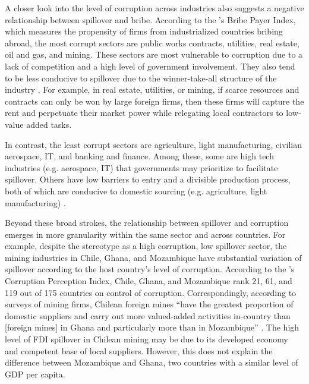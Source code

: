 A closer look into the level of corruption across industries also suggests a negative relationship between spillover and bribe. According to the \citet{TransparencyInternational2011}'s Bribe Payer Index, which measures the propensity of firms from industrialized countries bribing abroad, the most corrupt sectors are public works contracts, utilities, real estate, oil and gas, and mining. These sectors are most vulnerable to corruption due to a lack of competition and a high level of government involvement. They also tend to be less conducive to spillover due to the winner-take-all structure of the industry \citep[138]{UNCTAD2001}. For example, in real estate, utilities, or mining, if scarce resources and contracts can only be won by large foreign firms, then these firms will capture the rent and perpetuate their market power while relegating local contractors to low-value added tasks.

In contrast, the least corrupt sectors are agriculture, light manufacturing, civilian aerospace, IT, and banking and finance. Among these, some are high tech industries (e.g. aerospace, IT) that governments may prioritize to facilitate spillover. Others have low barriers to entry and a divisible production process, both of which are conducive to domestic sourcing (e.g. agriculture, light manufacturing) \citep{TransparencyInternational2011}.

Beyond these broad strokes, the relationship between spillover and corruption emerges in more granularity within the same sector and across countries. For example, despite the stereotype as a high corruption, low spillover sector, the mining industries in Chile, Ghana, and Mozambique have substantial variation of spillover according to the host country's level of corruption. According to the \citet{TransparencyInternational2014}'s Corruption Perception Index, Chile, Ghana, and Mozambique rank 21, 61, and 119 out of 175 countries on control of corruption. Correspondingly, according to surveys of mining firms, Chilean foreign mines ``have the greatest proportion of domestic suppliers and carry out more valued-added activities in-country than [foreign mines] in Ghana and particularly more than in Mozambique'' \citep[127]{Farole2014}. The high level of FDI spillover in Chilean mining may be due to its developed economy and competent base of local suppliers. However, this does not explain the difference between Mozambique and Ghana, two countries with a similar level of GDP per capita.

